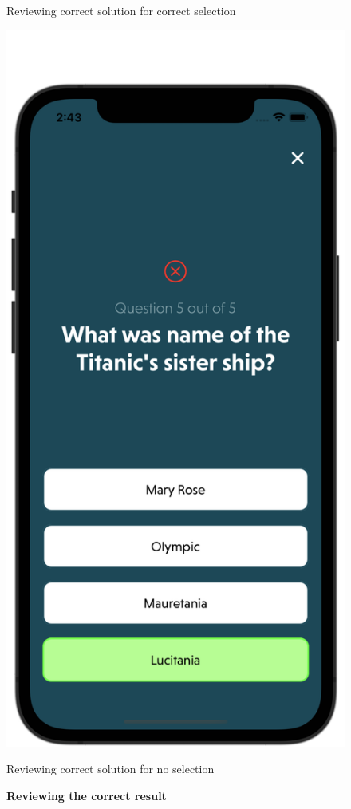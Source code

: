 \begin{figure}[H]
\begin{minipage}[b]{0.43\linewidth}
        \caption{Reviewing correct solution for correct selection}
    \end{minipage}
    \hspace{0.1\linewidth}
    \begin{minipage}[b]{0.43\linewidth}
        \centering
        \includegraphics[width=\linewidth]{Mobile UI/Result when no selection has been made.png}
        \caption{Reviewing correct solution for no selection}
    \end{minipage}
    \vspace{0.5cm}
    \caption{\textbf{Reviewing the correct result}}
\end{figure}

